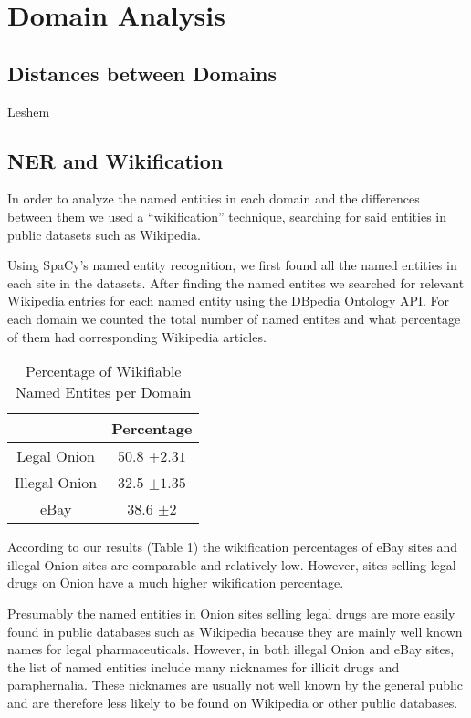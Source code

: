 \documentclass[11pt,a4paper]{article}
\begin{document}
\section{Domain Analysis}

\subsection{Distances between Domains}

Leshem



\subsection{NER and Wikification}

In order to analyze the named entities in each domain and the differences
between them we used a ``wikification'' technique, searching for
said entities in public datasets such as Wikipedia. 

Using SpaCy's named entity recognition, we first found all the named
entities in each site in the datasets. After finding the named entites
we searched for relevant Wikipedia entries for each named entity using
the DBpedia Ontology API. For each domain we counted the total number
of named entites and what percentage of them had corresponding Wikipedia
articles.

\begin{table}

\caption{Percentage of Wikifiable Named Entites per Domain}

\begin{centering}
\begin{tabular}{|c||c|}
\hline 
 & Percentage\tabularnewline
\hline 
\hline 
Legal Onion & 50.8 $\pm2.31$\tabularnewline
\hline 
\hline 
Illegal Onion & 32.5 $\pm1.35$\tabularnewline
\hline 
\hline 
eBay & 38.6 $\pm2$\tabularnewline
\hline 
\end{tabular}
\par\end{centering}
\end{table}
According to our results (Table 1) the wikification percentages of
eBay sites and illegal Onion sites are comparable and relatively low.
However, sites selling legal drugs on Onion have a much higher wikification
percentage.

Presumably the named entities in Onion sites selling legal drugs are
more easily found in public databases such as Wikipedia because they
are mainly well known names for legal pharmaceuticals. However, in
both illegal Onion and eBay sites, the list of named entities include
many nicknames for illicit drugs and paraphernalia. These nicknames
are usually not well known by the general public and are therefore
less likely to be found on Wikipedia or other public databases.
\end{document}
